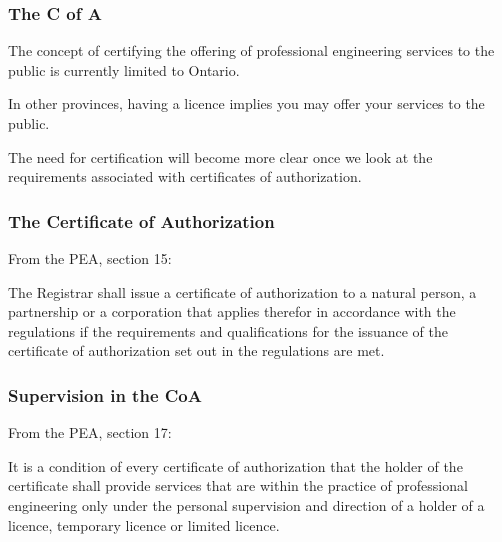 \begin{frame}
\frametitle{The C of A}

The concept of certifying the offering of professional engineering services to the public is currently limited to Ontario.


In other provinces, having a licence implies you may offer your services to the public.

	The need for certification will become more clear once we look at the requirements associated with certificates of authorization.

\end{frame}



\begin{frame}
\frametitle{The Certificate of Authorization}

From the PEA, section 15:

The Registrar shall issue a certificate of authorization to a 	natural person, a partnership or a corporation that applies 	therefor in accordance with the regulations if the requirements 	and qualifications for the issuance of the certificate of 	authorization set out in the regulations are met. 

\end{frame}



\begin{frame}
\frametitle{Supervision in the CoA}

From the PEA, section 17:

It is a condition of every certificate of authorization that the 	holder of the certificate shall provide services that are within 	the practice of professional engineering only under the 	personal supervision and direction of a holder of a licence, 	temporary licence or limited licence.


\end{frame}




